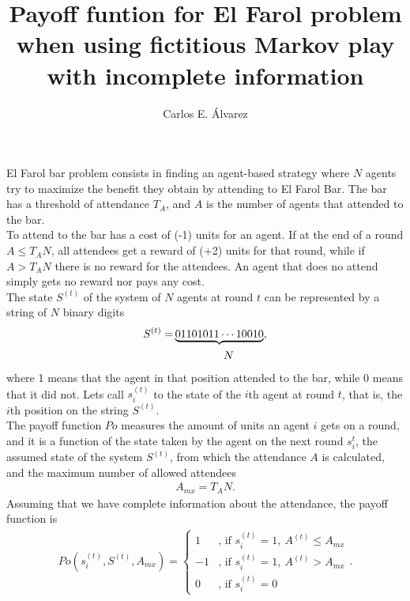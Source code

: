 \documentclass[12pt]{article}
\begin{document}
\title{Payoff funtion for El Farol problem when using fictitious Markov play with incomplete information}
\author{Carlos E. \'Alvarez}
\maketitle

El Farol bar problem consists in finding an agent-based strategy where $N$ agents try to maximize the benefit they obtain by attending to El Farol Bar. The bar has a threshold of attendance $T_A$, and $A$ is the number of agents that attended to the bar.\\

To attend to the bar has a cost of (-1) units for an agent. If at the end of a round $A\leq T_{A}N$, all attendees get a reward of (+2) units for that round, while if $A> T_{A}N$ there is no reward for the attendees. An agent that does no attend simply gets no reward nor pays any cost.\\

The state $S^{(t)}$ of the system of $N$ agents at round $t$ can be represented by a string of $N$ binary digits
\begin{align}
  S^{(t)}=&\underbrace{01101011\cdots10010},\nonumber\\
  &\hspace{1.6cm}N\nonumber
\end{align}
where 1 means that the agent in that position attended to the bar, while 0 means that it did not. Lets call $s_i^{(t)}$ to the state of the $i$th agent at round $t$, that is, the $i$th position on the string $S^{(t)}$.\\

The payoff function $Po$ measures the amount of units an agent $i$ gets on a round, and it is a function of the state taken by the agent on the next round $s_i^{t}$, the assumed state of the system $S^{(t)}$, from which the attendance $A$ is calculated, and the maximum number of allowed attendees
\begin{align}
  A_{mx}=T_AN.
\end{align}
Assuming that we have complete information about the attendance, the payoff function is
\begin{align}
  Po(s_i^{(t)},S^{(t)},A_{mx})=\left\{\begin{array}{ll}
  1&\text{, if }s_i^{(t)}=1,\ A^{(t)}\leq A_{mx}\\
  -1&\text{, if }s_i^{(t)}=1,\ A^{(t)}> A_{mx}\\
  0&\text{, if }s_i^{(t)}=0
  \end{array}\right. .
  \label{payoff}
\end{align}
\end{document}
